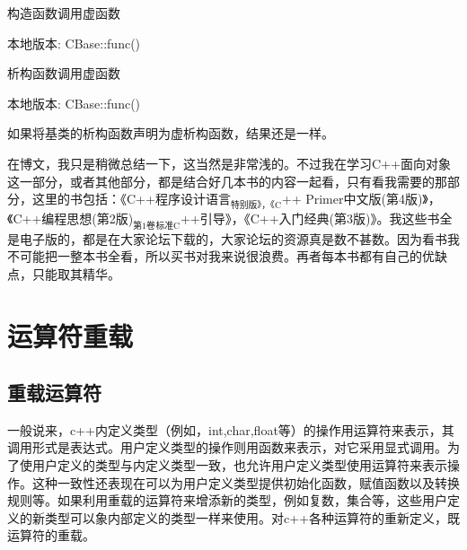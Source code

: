 \documentclass{article}
\begin{document}
构造函数调用虚函数

本地版本: CBase::func()

析构函数调用虚函数

本地版本: CBase::func()

如果将基类的析构函数声明为虚析构函数，结果还是一样。

在博文，我只是稍微总结一下，这当然是非常浅的。不过我在学习C++面向对象这一部分，或者其他部分，都是结合好几本书的内容一起看，只有看我需要的那部分，这里的书包括：《C++程序设计语言$_{\text{特别版》，《C}}$++ Primer中文版(第4版)》，《C++编程思想(第2版)$_{\text{第1卷}}$$_{\text{标准C}}$++引导》，《C++入门经典(第3版)》。我这些书全是电子版的，都是在大家论坛下载的，大家论坛的资源真是数不甚数。因为看书我不可能把一整本书全看，所以买书对我来说很浪费。再者每本书都有自己的优缺点，只能取其精华。

\section{运算符重载}
\label{sec-9}
\subsection{重载运算符}
\label{sec-9-1}
一般说来，c++内定义类型（例如，int,char,float等）的操作用运算符来表示，其调用形式是表达式。用户定义类型的操作则用函数来表示，对它采用显式调用。为了使用户定义的类型与内定义类型一致，也允许用户定义类型使用运算符来表示操作。这种一致性还表现在可以为用户定义类型提供初始化函数，赋值函数以及转换规则等。如果利用重载的运算符来增添新的类型，例如复数，集合等，这些用户定义的新类型可以象内部定义的类型一样来使用。对c++各种运算符的重新定义，既运算符的重载。
\end{document}
